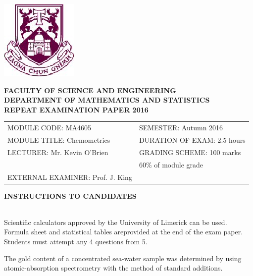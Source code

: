 \documentclass[a4paper,12pt]{article}
\begin{document}
\begin{center}
\includegraphics[scale=0.65]{images/shieldtransparent2}
\end{center}

\begin{center}
\vspace{1cm}
\large \bf {FACULTY OF SCIENCE AND ENGINEERING} \\[0.5cm]
\normalsize DEPARTMENT OF MATHEMATICS AND STATISTICS \\[1.25cm]
\large \bf {REPEAT EXAMINATION PAPER 2016} \\[1.5cm]
\end{center}

\begin{tabular}{ll}
MODULE CODE: MA4605 & SEMESTER: Autumn 2016 \\[1cm]
MODULE TITLE: Chemometrics & DURATION OF EXAM: 2.5 hours \\[1cm]
LECTURER: Mr. Kevin O'Brien & GRADING SCHEME: 100 marks \\
& \phantom{GRADING SCHEME:} \footnotesize {60\% of module grade} \\[0.8cm]
EXTERNAL EXAMINER: Prof. J. King & \\
\end{tabular}
\bigskip
\begin{center}
{\bf INSTRUCTIONS TO CANDIDATES}
\end{center}

{\noindent \\ Scientific calculators approved by the University of Limerick can be used. \\
Formula sheet and statistical tables areprovided at the end of the exam paper.\\
Students must attempt any 4 questions from 5.}
\newpage




The gold content of a concentrated sea-water sample was determined by using
atomic-absorption spectrometry with the method of standard additions.
\end{document}
